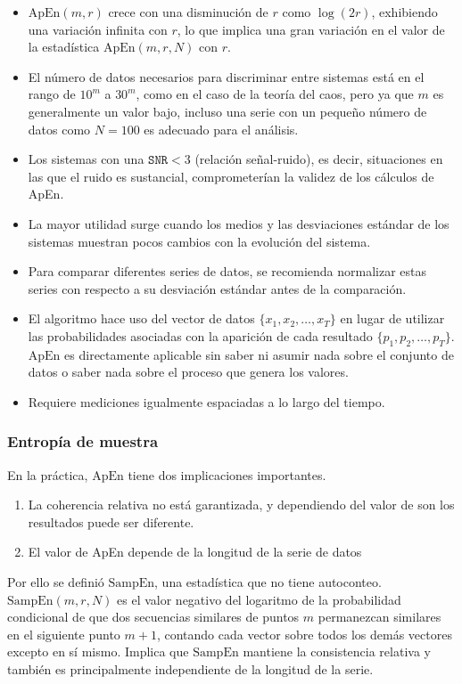 \documentclass[a4paper,12pt]{article}
\begin{document}
\begin{itemize}[noitemsep, topsep=2pt]
	\item $\textrm{ApEn}(m, r)$ crece con una disminución de $r$ como $\log(2r)$, exhibiendo una variación infinita con $r$, lo que implica una gran variación en el valor de la estadística $\textrm{ApEn}(m, r, N)$ con $r$.
	\item El número de datos necesarios para discriminar entre sistemas está en el rango de $10^m$ a $30^m$, como en el caso de la teoría del caos, pero ya que $m$ es generalmente un valor bajo, incluso una serie con un pequeño número de datos como $N = 100$ es adecuado para el análisis.
	\item Los sistemas con una $\texttt{SNR}<3$ (relación señal-ruido), es decir, situaciones en las que el ruido es sustancial, comprometerían la validez de los cálculos de ApEn.
	\item La mayor utilidad surge cuando los medios y las desviaciones estándar de los sistemas muestran pocos cambios con la evolución del sistema.
	\item Para comparar diferentes series de datos, se recomienda normalizar estas series con respecto a su desviación estándar antes de la comparación.
	\item El algoritmo hace uso del vector de datos $\{x_1, x_2, \dots, x_T\}$ en lugar de utilizar las probabilidades asociadas con la aparición de cada resultado $\{p_1, p_2, \dots, p_T\}$. $\textrm{ApEn}$ es directamente aplicable sin saber ni asumir nada sobre el conjunto de datos o saber nada sobre el proceso que genera los valores. 
	\item Requiere mediciones igualmente espaciadas a lo largo del tiempo. 
\end{itemize}

\subsubsection{Entropía de muestra }
En la práctica, $\textrm{ApEn}$ tiene dos implicaciones importantes. 
\begin{enumerate}[noitemsep, topsep=2pt]
	\item La coherencia relativa no está garantizada, y dependiendo del valor de son los resultados puede ser diferente.
	\item El valor de ApEn depende de la longitud de la serie de datos
\end{enumerate}

Por ello se definió $\textrm{SampEn}$, una estadística que no tiene autoconteo. $\textrm{SampEn}(m, r, N)$ es el valor negativo del logaritmo de la probabilidad condicional de que dos secuencias similares de puntos $m$ permanezcan similares en el siguiente punto $m+1$, contando cada vector sobre todos los demás vectores excepto en sí mismo. Implica que $\textrm{SampEn}$ mantiene la consistencia relativa y también es principalmente independiente de la longitud de la serie.
\end{document}
